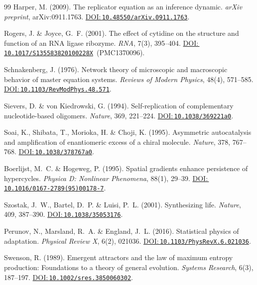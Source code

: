 \documentclass[12pt,a4paper]{article}
\newcommand{\doilink}[1]{\href{https://doi.org/#1}{DOI:\,\nolinkurl{#1}}}
\theoremstyle{remark}
\begin{document}
\begin{thebibliography}{99}
Harper, M. (2009).
\newblock The replicator equation as an inference dynamic.
\newblock \textit{arXiv preprint}, arXiv:0911.1763.
\newblock \doilink{10.48550/arXiv.0911.1763}.

Rogers, J. \& Joyce, G.~F. (2001).
\newblock The effect of cytidine on the structure and function of an RNA ligase ribozyme.
\newblock \textit{RNA}, 7(3), 395--404.
\newblock \doilink{10.1017/S135583820100228X}~(PMC1370096).

Schnakenberg, J. (1976).
\newblock Network theory of microscopic and macroscopic behavior of master equation systems.
\newblock \textit{Reviews of Modern Physics}, 48(4), 571--585.
\newblock \doilink{10.1103/RevModPhys.48.571}.

Sievers, D. \& von Kiedrowski, G. (1994).
\newblock Self-replication of complementary nucleotide-based oligomers.
\newblock \textit{Nature}, 369, 221--224.
\newblock \doilink{10.1038/369221a0}.

Soai, K., Shibata, T., Morioka, H. \& Choji, K. (1995).
\newblock Asymmetric autocatalysis and amplification of enantiomeric excess of a chiral molecule.
\newblock \textit{Nature}, 378, 767--768.
\newblock \doilink{10.1038/378767a0}.

Boerlijst, M.~C. \& Hogeweg, P. (1995).
\newblock Spatial gradients enhance persistence of hypercycles.
\newblock \textit{Physica D: Nonlinear Phenomena}, 88(1), 29--39.
\newblock \doilink{10.1016/0167-2789(95)00178-7}.


Szostak, J.~W., Bartel, D.~P. \& Luisi, P.~L. (2001).
\newblock Synthesizing life.
\newblock \textit{Nature}, 409, 387--390.
\newblock \doilink{10.1038/35053176}.

Perunov, N., Marsland, R.~A. \& England, J.~L. (2016).
\newblock Statistical physics of adaptation.
\newblock \textit{Physical Review X}, 6(2), 021036.
\newblock \doilink{10.1103/PhysRevX.6.021036}.

Swenson, R. (1989).
\newblock Emergent attractors and the law of maximum entropy production: Foundations to a theory of general evolution.
\newblock \textit{Systems Research}, 6(3), 187--197.
\newblock \doilink{10.1002/sres.3850060302}.


\end{thebibliography}
\end{document}
